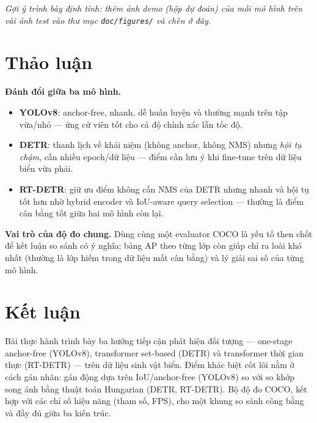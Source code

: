 \documentclass[12pt]{article}
\newcommand{\runin}[1]{\par\medskip\noindent\textbf{#1}\hspace{0.4em}\ignorespaces}
\numberwithin{equation}{section}
\begin{document}
\textit{Gợi ý trình bày định tính: thêm ảnh demo (hộp dự đoán) của mỗi mô hình trên vài ảnh
test vào thư mục \texttt{doc/figures/} và chèn ở đây.}

\section{Thảo luận}

\runin{Đánh đổi giữa ba mô hình.}
\begin{itemize}
  \item \textbf{YOLOv8}: anchor-free, nhanh, dễ huấn luyện và thường mạnh trên tập vừa/nhỏ ---
  ứng cử viên tốt cho cả độ chính xác lẫn tốc độ.
  \item \textbf{DETR}: thanh lịch về khái niệm (không anchor, không NMS) nhưng \textit{hội tụ
  chậm}, cần nhiều epoch/dữ liệu --- điểm cần lưu ý khi fine-tune trên dữ liệu biển vừa phải.
  \item \textbf{RT-DETR}: giữ ưu điểm không cần NMS của DETR nhưng nhanh và hội tụ tốt hơn nhờ
  hybrid encoder và IoU-aware query selection --- thường là điểm cân bằng tốt giữa hai mô hình
  còn lại.
\end{itemize}

\runin{Vai trò của độ đo chung.} Dùng cùng một evaluator COCO là yếu tố then chốt để kết luận
so sánh có ý nghĩa; bảng AP theo từng lớp còn giúp chỉ ra loài khó nhất (thường là lớp hiếm
trong dữ liệu mất cân bằng) và lý giải sai số của từng mô hình.

\section{Kết luận}

Bài thực hành trình bày ba hướng tiếp cận phát hiện đối tượng --- one-stage anchor-free
(YOLOv8), transformer set-based (DETR) và transformer thời gian thực (RT-DETR) --- trên dữ liệu
sinh vật biển. Điểm khác biệt cốt lõi nằm ở cách gán nhãn: gán động dựa trên IoU/anchor-free
(YOLOv8) so với so khớp song ánh bằng thuật toán Hungarian (DETR, RT-DETR). Bộ độ đo COCO, kết
hợp với các chỉ số hiệu năng (tham số, FPS), cho một khung so sánh công bằng và đầy đủ giữa ba
kiến trúc.

\end{document}
